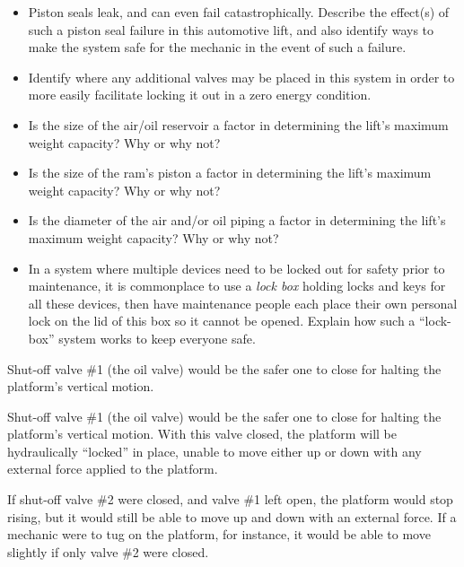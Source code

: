 \begin{itemize}
\item{} Piston seals leak, and can even fail catastrophically.  Describe the effect(s) of such a piston seal failure in this automotive lift, and also identify ways to make the system safe for the mechanic in the event of such a failure.
\item{} Identify where any additional valves may be placed in this system in order to more easily facilitate locking it out in a zero energy condition.
\item{} Is the size of the air/oil reservoir a factor in determining the lift's maximum weight capacity?  Why or why not?
\item{} Is the size of the ram's piston a factor in determining the lift's maximum weight capacity?  Why or why not?
\item{} Is the diameter of the air and/or oil piping a factor in determining the lift's maximum weight capacity?  Why or why not?
\item{} In a system where multiple devices need to be locked out for safety prior to maintenance, it is commonplace to use a {\it lock box} holding locks and keys for all these devices, then have maintenance people each place their own personal lock on the lid of this box so it cannot be opened.  Explain how such a ``lock-box'' system works to keep everyone safe.
\end{itemize}







Shut-off valve \#1 (the oil valve) would be the safer one to close for halting the platform's vertical motion.







Shut-off valve \#1 (the oil valve) would be the safer one to close for halting the platform's vertical motion.  With this valve closed, the platform will be hydraulically ``locked'' in place, unable to move either up or down with any external force applied to the platform.

\vskip 10pt

If shut-off valve \#2 were closed, and valve \#1 left open, the platform would stop rising, but it would still be able to move up and down with an external force.  If a mechanic were to tug on the platform, for instance, it would be able to move slightly if only valve \#2 were closed.

